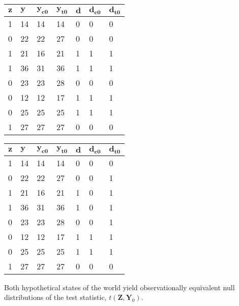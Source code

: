 \documentclass[12pt,leqno]{article}
\theoremstyle{newstyle}
\begin{document}
\begin{table}[H]
\centering
    \begin{tabular}{l|l|l|l|l|l|l}
    $\mathbf{z}$ & $\mathbf{y}$ & $\mathbf{y_{c0}}$ & $\mathbf{y_{t0}}$ & $\mathbf{d}$ & $\mathbf{d_{c0}}$ & $\mathbf{d_{t0}}$ \\ \hline
    1 & 14 & 14 & 14 & 0 & 0 & 0 \\
    0 & 22 & 22 & 27 & 0 & 0 & 0 \\
    1 & 21 & 16 & 21 & 1 & 1 & 1 \\
    1 & 36 & 31 & 36 & 1 & 1 & 1 \\
    0 & 23 & 23 & 28 & 0 & 0 & 0 \\
    0 & 12 & 12 & 17 & 1 & 1 & 1 \\
    0 & 25 & 25 & 25 & 1 & 1 & 1 \\
    1 & 27 & 27  & 27 & 0 & 0 & 0\\
    \end{tabular}
    \hfill 
    \begin{tabular}{l|l|l|l|l|l|l}
    $\mathbf{z}$ & $\mathbf{y}$ & $\mathbf{y_{c0}}$ & $\mathbf{y_{t0}}$ & $\mathbf{d}$ & $\mathbf{d_{c0}}$ & $\mathbf{d_{t0}}$ \\ \hline
    1 & 14 & 14 & 14 & 0 & 0 & 0 \\
    0 & 22 & 22 & 27 & 0 & 0 & 1 \\
    1 & 21 & 16 & 21 & 1 & 0 & 1 \\
    1 & 36 & 31 & 36 & 1 & 0 & 1 \\
    0 & 23 & 23 & 28 & 0 & 0 & 1 \\
    0 & 12 & 12 & 17 & 1 & 1 & 1 \\
    0 & 25 & 25 & 25 & 1 & 1 & 1 \\
    1 & 27 & 27  & 27 & 0 & 0 & 0\\
    \end{tabular}
\end{table}

Both hypothetical states of the world yield observationally equivalent
null distributions of the test statistic,
\(t\left(\mathbf{Z}, \mathbf{Y}_0\right)\).
\end{document}
